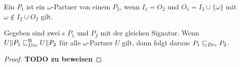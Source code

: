\begin{Def}
  Ein \MEIO{} $P_1$ ist ein $\omega$-Partner von einem \MEIO{} $P_2$, wenn
  $I_1=O_2$ und $O_1=I_2\cup\{\omega\}$ mit $\omega\notin I_2\cup O_2$ gilt.
\end{Def}

\begin{Lem}
  Gegeben sind zwei \MEIO{}s $P_1$ und $P_2$ mit der gleichen Signatur. Wenn
  $U\|P_1 \sqsubseteq  _{Div}^\mathrm{B} U\|P_2$ für alle $\omega$-Partner $U$ gilt, dann folgt daraus
  $P_1 \sqsubseteq  _{Div} P_2$.
\end{Lem}
\begin{proof}
  \textbf{TODO zu beweisen}
\end{proof}
